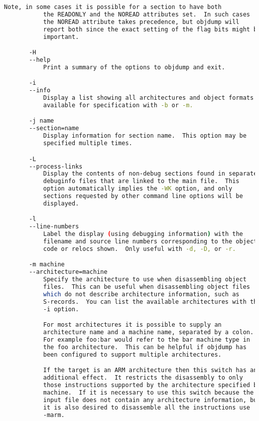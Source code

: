 {{\begin{lstlisting}[language=bash]
           Note, in some cases it is possible for a section to have both
           the READONLY and the NOREAD attributes set.  In such cases
           the NOREAD attribute takes precedence, but objdump will
           report both since the exact setting of the flag bits might be
           important.

       -H
       --help
           Print a summary of the options to objdump and exit.

       -i
       --info
           Display a list showing all architectures and object formats
           available for specification with -b or -m.

       -j name
       --section=name
           Display information for section name.  This option may be
           specified multiple times.

       -L
       --process-links
           Display the contents of non-debug sections found in separate
           debuginfo files that are linked to the main file.  This
           option automatically implies the -WK option, and only
           sections requested by other command line options will be
           displayed.

       -l
       --line-numbers
           Label the display (using debugging information) with the
           filename and source line numbers corresponding to the object
           code or relocs shown.  Only useful with -d, -D, or -r.

       -m machine
       --architecture=machine
           Specify the architecture to use when disassembling object
           files.  This can be useful when disassembling object files
           which do not describe architecture information, such as
           S-records.  You can list the available architectures with the
           -i option.

           For most architectures it is possible to supply an
           architecture name and a machine name, separated by a colon.
           For example foo:bar would refer to the bar machine type in
           the foo architecture.  This can be helpful if objdump has
           been configured to support multiple architectures.

           If the target is an ARM architecture then this switch has an
           additional effect.  It restricts the disassembly to only
           those instructions supported by the architecture specified by
           machine.  If it is necessary to use this switch because the
           input file does not contain any architecture information, but
           it is also desired to disassemble all the instructions use
           -marm.


\end{lstlisting}}}
